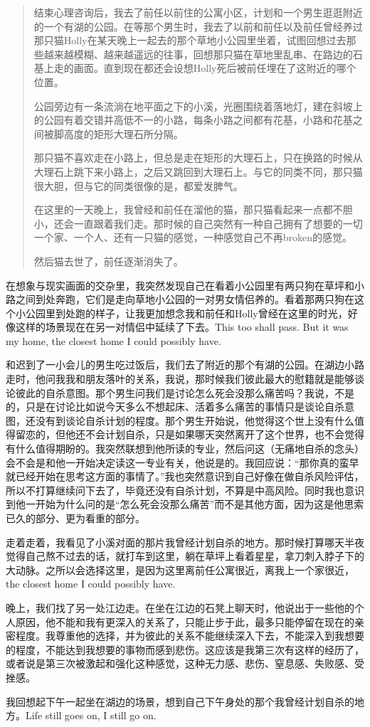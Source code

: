 \blockquote{
    结束心理咨询后，我去了前任以前住的公寓小区，计划和一个男生逛逛附近的一个有湖的公园。在等那个男生时，我去了以前和前任以及前任曾经养过那只猫Holly在某天晚上一起去的那个草地小公园里坐着，试图回想过去那些越来越模糊、越来越遥远的往事，回想那只猫在草地里乱串、在路边的石基上走的画面。直到现在都还会设想Holly死后被前任埋在了这附近的哪个位置。

    公园旁边有一条流淌在地平面之下的小溪，光圈围绕着落地灯，建在斜坡上的公园有着交错并高低不一的小路，每条小路之间都有花基，小路和花基之间被脚高度的矩形大理石所分隔。

    那只猫不喜欢走在小路上，但总是走在矩形的大理石上，只在换路的时候从大理石上跳下来小路上，之后又跳回到大理石上。与它的同类不同，那只猫很大胆，但与它的同类很像的是，都爱发脾气。

    在这里的一天晚上，我曾经和前任在溜他的猫，那只猫看起来一点都不胆小，还会一直跟着我们走。那时候的自己突然有一种自己拥有了想要的一切\pozhehao{}一个家、一个人、还有一只猫\pozhehao{}的感觉，一种感觉自己不再broken的感觉。

    然后猫去世了，前任逐渐消失了。
}


在想象与现实画面的交杂里，我突然发现自己在看着小公园里有两只狗在草坪和小路之间到处奔跑，它们是走向草地小公园的一对男女情侣养的。看着那两只狗在这个小公园里到处跑的样子，让我更加想念我和前任和Holly曾经在这里的时光，好像这样的场景现在在另一对情侣中延续了下去。This too shall pass. But it was my home, the closest home I could possibly have.

和迟到了一小会儿的男生吃过饭后，我们去了附近的那个有湖的公园。在湖边小路走时，他问我我和朋友落叶的关系，我说，那时候我们彼此最大的慰籍就是能够谈论彼此的自杀意图。那个男生问我们是讨论怎么死会没那么痛苦吗？我说，不是的，只是在讨论比如说今天多么不想起床、活着多么痛苦的事情\pozhehao{}只是谈论自杀意图，还没有到谈论自杀计划的程度。那个男生开始说，他觉得这个世上没有什么值得留恋的，但他还不会计划自杀，只是如果哪天突然离开了这个世界，也不会觉得有什么值得期盼的。我突然联想到他所读的专业，然后问这（无痛地自杀的念头）会不会是和他一开始决定读这一专业有关，他说是的。我回应说：“那你真的蛮早就已经开始在思考这方面的事情了。”我也突然意识到自己好像在做自杀风险评估，所以不打算继续问下去了，毕竟还没有自杀计划，不算是中高风险。同时我也意识到他一开始为什么问的是“怎么死会没那么痛苦”而不是其他方面，因为这是他思索已久的部分、更为看重的部分。

走着走着，我看见了小溪对面的那片我曾经计划自杀的地方。那时候打算哪天半夜觉得自己熬不过去的话，就打车到这里，躺在草坪上看着星星，拿刀刺入脖子下的大动脉。之所以会选择这里，是因为这里离前任公寓很近，离我上一个家很近，the closest home I could possibly have.


晚上，我们找了另一处江边走。在坐在江边的石凳上聊天时，他说出于一些他的个人原因，他不能和我有更深入的关系了，只能止步于此，最多只能停留在现在的亲密程度。我尊重他的选择，并为彼此的关系不能继续深入下去，不能深入到我想要的程度，不能达到我想要的事物而感到悲伤。这应该是我第三次有这样的经历了，或者说是第三次被激起和强化这种感觉，这种无力感、悲伤、窒息感、失败感、受挫感。

我回想起下午一起坐在湖边的场景，想到自己下午身处的那个我曾经计划自杀的地方。Life still goes on, I still go on.

